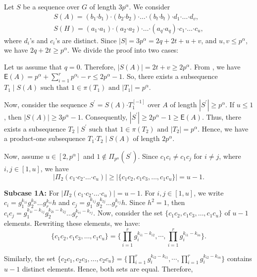 \documentclass[a4paper,11pt]{article}
\numberwithin{equation}{section}
\newcommand{\bdot}{\boldsymbol{\cdot}}
\newcommand{\no}{\noindent}
\begin{document}
\no Let $S$ be a sequence over $G$ of length $3p^{\alpha}$.  We consider
    \begin{align*}
    S(A)=(b_1 \bdot b_1) \bdot (b_2 \bdot b_2)\bdot \dotsc \bdot (b_t \bdot b_t)\bdot d_1\bdot \dotsc \bdot d_v,\\
S(H)=(a_1 \bdot a_1) \bdot (a_2 \bdot a_2)\bdot \dotsc \bdot (a_q \bdot a_q)\bdot c_1\bdot \dotsc \bdot c_u,
\end{align*} where $d_i$'s and $c_i$'s are distinct. Since $|S|=3p^{\alpha}=2q+2t+u+v$, and $u,v \le p^{\alpha}$, we have $2q+2t \ge p^{\alpha}$. We divide the proof into two cases:

  Let us assume that $q=0.$ Therefore, $|S(A)|=2t+v \ge 2p^{\alpha}$. From \cite{Olson1969I}, we have $\mathsf{E}(A)=p^{\alpha}+\sum_{i=1}^r p^{\alpha_i}-r \le 2p^{\alpha}-1$. So, there exists a subsequence $T_1 \mid S(A) \text{ such that } 1 \in \pi(T_1) \text{ and } |T_1|=p^{\alpha}.$


\no Now, consider the sequence $S^{\prime}=S(A) \bdot T_1^{[-1]}$ over $A$ of length $|S^{\prime}| \ge p^{\alpha}$. If $u \le 1$, then $|S(A)| \ge 3p^{\alpha}-1.$ Consequently, $|S^{\prime}| \ge 2p^{\alpha}-1 \ge \mathsf{E}(A).$ Thus, there exists a subsequence $T_2 \mid S^{\prime} \text{ such that } 1 \in \pi(T_2) \text{ and }   |T_2|=p^{\alpha}.$ Hence, we have a product-one subsequence $T_1 \bdot T_2 \mid S(A)$ of length $2p^{\alpha}.$


\no Now, assume $u\in [2, p^{\alpha}]$ and $1 \notin \Pi_{p^{\alpha}}(S^{\prime})$. Since $c_1c_i \neq c_1c_j$ for $i \neq j$, where $i,j\in [1, u]$, we have $$\big|\Pi_2(c_1 \bdot c_2\bdot \dotsc \bdot c_u)\big| \ge|\{c_1c_2,c_1c_3, \dotsc ,c_1c_u\}| = u-1.$$

\noindent \textbf{Subcase 1A:} For $\big|\Pi_2(c_1 \bdot c_2\bdot \dotsc \bdot c_u)\big| = u-1$.
For $i,j \in [1,u]$, we write $c_i=g_1^{k_{1i}}g_2^{k_{2i}}\dotsc g_r^{k_{ri}}h$ and $c_j=g_1^{k_{1j}}g_2^{k_{2j}}\dotsc g_r^{k_{rj}}h$. Since $h^2=1$, then 
$c_ic_j=g_1^{k_{1i}-k_{1j}}g_2^{k_{2i}-k_{2j}}\dotsc g_r^{k_{ri}-k_{rj}}.$
Now, consider the set $\{c_1c_2,c_1c_3,\dotsc,c_1c_u \}$ of $u-1$ elements. Rewriting these elements, we have:
 $$\{c_1c_2,c_1c_3,\dotsc,c_1c_u \}=\Big\{ \prod_{i=1}^rg_i^{k_{i1}-k_{i2}},\cdots, \prod_{i=1}^rg_i^{k_{i1}-k_{iu}}\Big\}.$$
 
 


 
\no Similarly, the set $\{c_2c_1,c_2c_3,\dotsc,c_2c_u \}=\Big\{ \prod_{i=1}^rg_i^{k_{i2}-k_{i1}},\cdots, \prod_{i=1}^rg_i^{k_{i2}-k_{iu}}
\Big\}$ contains $u-1$ distinct elements. Hence, both sets are equal. Therefore,
\end{document}
